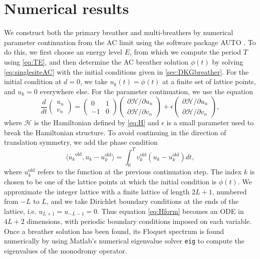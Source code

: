 \documentclass[12pt,reqno]{amsart}
\def\calH{\mathcal{H}}
\theoremstyle{definition}
\begin{document}
\section{Numerical results}\label{sec:numerics}

We construct both the primary breather and multi-breathers by numerical parameter continuation from the AC limit using the software package AUTO \cite{auto07p}. To do this, we first choose an energy level $E$, from which we compute the period $T$ using \cref{eq:TE}, and then determine the AC breather solution $\phi(t)$ by solving \cref{eq:singlesiteAC} with the initial conditions given in \cref{sec:DKGbreather}. For the initial condition at $d = 0$, we take $u_k(t) = \phi(t)$ at a finite set of lattice points, and $u_k = 0$ everywhere else. For the parameter continuation, we use the equation
\begin{equation}\label{eq:HformAUTO}
\frac{d}{dt}\begin{pmatrix} u_n \\ v_n \end{pmatrix} = 
\begin{pmatrix} 0 & 1 \\ -1 & 0 \end{pmatrix}\begin{pmatrix} \partial \calH / \partial u_n \\ \partial \calH / \partial v_n \end{pmatrix} + 
\epsilon \begin{pmatrix} \partial \calH / \partial u_n \\ \partial \calH / \partial v_n \end{pmatrix},
\end{equation}
where $\calH$ is the Hamiltonian defined by \cref{eq:H} and $\epsilon$ is a small parameter used to break the Hamiltonian structure. To avoid continuing in the direction of translation symmetry, we add the phase condition
\[
\langle \dot{u_k}^\text{old}, u_k - u_k^\text{old} \rangle =
\int_0^T v_k^\text{old}( u_k - u_k^\text{old}) dt,
\]
where $u_k^\text{old}$ refers to the function at the previous continuation step. The index $k$ is chosen to be one of the lattice points at which the initial condition is $\phi(t)$. We approximate the integer lattice with a finite lattice of length $2L+1$, numbered from $-L$ to $L$, and we take Dirichlet boundary conditions at the ends of the lattice, i.e. $u_{L+1} = u_{-L-1} = 0$. Thus equation \cref{eq:Hform} becomes an ODE in $4L+2$ dimensions, with periodic boundary conditions imposed on each variable. Once a breather solution has been found, its Floquet spectrum is found numerically by using Matlab's numerical eigenvalue solver \texttt{eig} to compute the eigenvalues of the monodromy operator.
\end{document}
